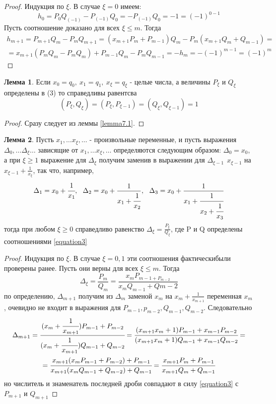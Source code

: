 \documentclass[a4paper, 12pt]{article}
\theoremstyle{definition}
\newtheorem{lemma}{Лемма}[section]
\begin{document}
    \begin{proof}
        Индукция по $\xi$. В случае $\xi=0$ имеем: \[h_0=P_0Q_{(-1)}-P_{(-1)}Q_0=-P_{(-1)}Q_0=-1=(-1)^{0-1}\]
        Пусть соотношение доказано для всех $\xi\leq m$. Тогда 
        \begin{multline*}
            h_{m+1}=P_{m+1}Q_m-P_m Q_{m+1}=(x_{m+1}P_m+P_{m-1})Q_m-P_m(x_{m+1}Q_m+Q_{m-1})=\\=x_{m+1}(P_m Q_m-P_m Q_m)+P_{m-1}Q_m-P_m Q_{m-1}=-h_m=-(-1)^{m-1}=(-1)^m
        \end{multline*}
    \end{proof} 
    \begin{lemma}\label{lemma7.2}
        Если $x_0=q_0,\ x_1=q_1,\ x_{\xi}=q_{\xi}$ - целые числа, а величины $P_{\xi}$ и $Q_{\xi}$ определены в (3) то справедливы равентсва \[(P_{\xi},Q_{\xi})=(P_{\xi},P_{\xi-1})=(Q_{\xi},Q_{\xi-1})=1\]
    \end{lemma} 
    \begin{proof}
        Сразу следует из леммы \ref{lemma7.1}.
    \end{proof} 
    \begin{lemma}\label{lemma7.3}
        Пусть $x_1,\dots x_{\xi},\dots$ - произвольные переменные, и пусть выражения $\Delta_0,\dots \Delta_{\xi}\dots$ зависящие от $x_1,\dots x_{\xi},\dots$ определяются следующим образом: $\Delta_0=x_0$, а при $\xi\geq 1$ выражение для $\Delta_{\xi}$ получим заменив в выражении для $\Delta_{\xi-1}\ \ x_{\xi-1}$ на $x_{\xi-1}+\frac{1}{x_{\xi}}$, так что, например,
        \[\Delta_1=x_0+\cfrac{1}{x_1},\ \ \Delta_2=x_0+\frac{1}{x_1+\cfrac{1}{x_2}},\ \ \Delta_3=x_0+\frac{1}{x_1+\cfrac{1}{x_2+\cfrac{1}{x_3}}}\]
        тогда при любом $\xi\geq 0$ справедливо равенство $\Delta_{\xi}=\frac{P_{\xi}}{Q_{\xi}}$, где P и Q определены соотношениями \eqref{equation3}
    \end{lemma} 
    \begin{proof}
        Индукция по $\xi$. В случае $\xi=0,1$ эти соотношения фактическибыли проверены ранее. Пусть они верны для всех $\xi\leq m$. Тогда
        \[\Delta_{\xi}=\frac{P_m}{Q_m}=\frac{x_mP_{m-1+P_{m-2}}}{x_mQ_{m-1}+Q{m-2}}\]
        по определению, $\Delta_{m+1}$ получим из $\Delta_m$ заменой $x_m$ на $x_m+\frac{1}{x_{m+1}}$ переменная $x_m$, очевидно не входит в выражения для $P_{m-1}, p_{m-2}, Q_{m-1}, Q_{m-2}$. Следовательно
        \begin{multline*}
        \Delta_{m+1}=\cfrac{(x_m+\cfrac{1}{x_{m+1}})P_{m-1}+P_{m-2}}{(x_m+\cfrac{1}{x_{m+1}})Q_{m-1}+Q_{m-2}}=\cfrac{(x_{m+1}x_m+1)P_{m-1}+x_{m-1}P_{m-2}}{(x_{m+1}x_m+1)Q_{m-1}+x_{m-1}Q_{m-2}}=\\=\cfrac{x_{m+1}(x_m P_{m-1}+P_{m-2})+P_{m-1}}{x_{m+1}(x_m Q_{m-1}+Q_{m-2})+Q_{m-1}}=\cfrac{x_{m+1}P_m+P_{m-1}}{x_{m+1}Q_m+Q_{m-1}}
        \end{multline*}
        но числитель и знаменатель последней дроби совпадают в силу \eqref{equation3} с $P_{m+1}$ и $Q_{m+1}$
    \end{proof} 
\end{document}
